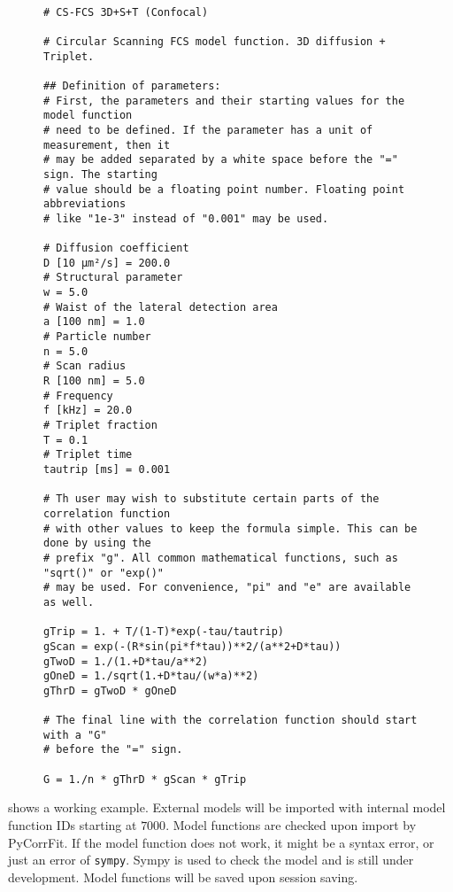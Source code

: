 \begin{figure}[tp]
\small
\begin{Verbatim}[frame = single]

# CS-FCS 3D+S+T (Confocal)

# Circular Scanning FCS model function. 3D diffusion + Triplet.

## Definition of parameters:
# First, the parameters and their starting values for the model function
# need to be defined. If the parameter has a unit of measurement, then it 
# may be added separated by a white space before the "=" sign. The starting
# value should be a floating point number. Floating point abbreviations 
# like "1e-3" instead of "0.001" may be used.

# Diffusion coefficient
D [10 µm²/s] = 200.0
# Structural parameter
w = 5.0
# Waist of the lateral detection area
a [100 nm] = 1.0
# Particle number
n = 5.0
# Scan radius
R [100 nm] = 5.0
# Frequency
f [kHz] = 20.0
# Triplet fraction
T = 0.1
# Triplet time
tautrip [ms] = 0.001

# Th user may wish to substitute certain parts of the correlation function
# with other values to keep the formula simple. This can be done by using the
# prefix "g". All common mathematical functions, such as "sqrt()" or "exp()"
# may be used. For convenience, "pi" and "e" are available as well.

gTrip = 1. + T/(1-T)*exp(-tau/tautrip)
gScan = exp(-(R*sin(pi*f*tau))**2/(a**2+D*tau))
gTwoD = 1./(1.+D*tau/a**2)
gOneD = 1./sqrt(1.+D*tau/(w*a)**2)
gThrD = gTwoD * gOneD

# The final line with the correlation function should start with a "G"
# before the "=" sign.

G = 1./n * gThrD * gScan * gTrip

\end{Verbatim}
\end{figure}
 shows a working example. External models will be imported with internal model function IDs starting at $7000$. Model functions are checked upon import by PyCorrFit. If the model function does not work, it might be a syntax error, or just an error of \texttt{sympy}. Sympy is used to check the model and is still under development. Model functions will be saved upon session saving.


